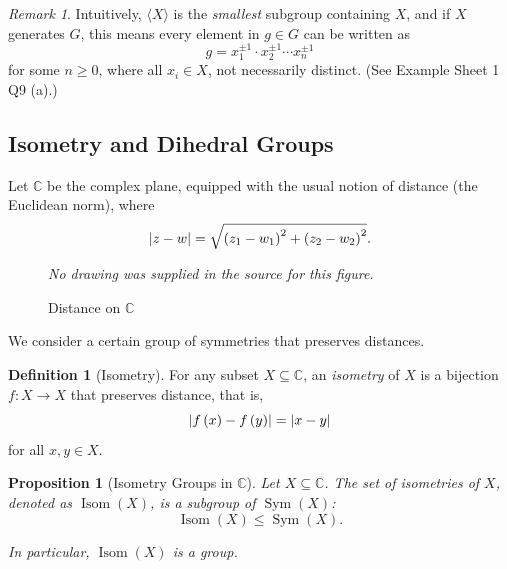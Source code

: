 \documentclass{article}
\newtheorem{proposition}[theorem]{Proposition}
\theoremstyle{definition}
\newtheorem{definition}[theorem]{Definition}
\theoremstyle{remark}
\newtheorem{remark}[theorem]{Remark}
\DeclarePairedDelimiter{\abs}{\lvert}{\rvert}
\newcommand{\pqty}[1]{\left(#1\right)}
\newcommand{\angBrac}[1]{\langle #1\rangle}
\newcommand{\functiondomain}[3]{#1:#2\to #3}
\newcommand{\subgroup}{\leq}
\newcommand{\CC}{\mathbb{C}}
\newcommand{\Sym}{\operatorname{Sym}}
\newcommand{\Isom}{\operatorname{Isom}}
\begin{document}
\begin{remark}
    Intuitively, \(\angBrac{X}\) is the \emph{smallest} subgroup containing \(X\), and if \(X\) generates \(G\), this means every element in \(g \in G\) can be written as
    \[
        g = x_1^{\pm 1} \cdot x_2^{\pm 1} \cdots x_n^{\pm 1}
    \]
    for some \(n \geq 0\), where all \(x_i \in X\), not necessarily distinct. (See Example Sheet 1 Q9 (a).)
\end{remark}

\subsection{Isometry and Dihedral Groups}
\label{sec:isometry-and-dihedral-groups}

Let \(\CC\) be the complex plane, equipped with the usual notion of distance (the Euclidean norm), where
\[
    \abs{z - w} = \sqrt{\pqty{z_1 - w_1}^2 + \pqty{z_2 - w_2}^2}.
\]

\begin{figure}[ht!]
    \centering
    \emph{No drawing was supplied in the source for this figure.}\par
\caption{Distance on \(\CC\)}
    \label{fig:distance-on-C}
\end{figure}

We consider a certain group of symmetries that preserves distances.

\begin{definition}[Isometry]
    \label{def:isometry}%
    For any subset \(X \subseteq \CC\), an \emph{isometry} of \(X\) is a bijection \(\functiondomain{f}{X}{X}\) that preserves distance, that is,
    \[
        \abs{f\pqty{x} - f\pqty{y}} = \abs{x - y}
    \]
    for all \(x, y \in X\).
\end{definition}

\begin{proposition}[Isometry Groups in \(\CC\)]
    \label{prop:isometry-group-in-C}%
    Let \(X \subseteq \CC\). The set of isometries of \(X\), denoted as \(\Isom\pqty{X}\), is a subgroup of \(\Sym\pqty{X}\):
    \[
        \Isom\pqty{X} \subgroup \Sym\pqty{X}.
    \]

    In particular, \(\Isom\pqty{X}\) is a group.
\end{proposition}
\end{document}
